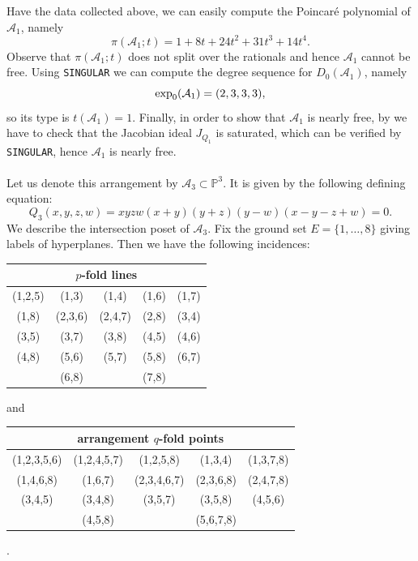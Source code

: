 \documentclass[11pt]{article}
\theoremstyle{plain}
\theoremstyle{definition}
\begin{document}
Have the data collected above, we can easily compute the Poincar\'e polynomial of $\mathcal{A}_{1}$, namely
$$\pi(\mathcal{A}_{1};t) = 1 + 8t + 24t^{2} + 31t^{3} + 14t^{4}.$$
Observe that $\pi(\mathcal{A}_{1};t)$ does not split over the rationals and hence $\mathcal{A}_{1}$ cannot be free. Using \texttt{SINGULAR} we can compute the degree sequence for $D_{0}(\mathcal{A}_{1})$, namely
$${\rm exp}_{0}(\mathcal{A}_{1}) = (2,3,3,3),$$
so its type is $t(\mathcal{A}_{1})=1$.
Finally, in order to show that $\mathcal{A}_{1}$ is nearly free, by \cite[Theorem 5.4]{DS} we have to check that the Jacobian ideal $J_{Q_{1}}$ is saturated, which can be verified by \texttt{SINGULAR}, hence $\mathcal{A}_{1}$ is nearly free.
\\\\
\noindent
{}
\vskip 5pt
\noindent
Let us denote this arrangement by $\mathcal{A}_{3} \subset \mathbb{P}^{3}$. It is given by the following defining equation:
$$Q_{3}(x,y,z,w) = xyzw(x+y)(y+z)(y-w)(x-y-z+w)=0.$$
We describe the intersection poset of $\mathcal{A}_{3}$. Fix the ground set $E= \{1, \ldots , 8\}$ giving labels of hyperplanes. Then we have the following incidences:
\begin{center}
\begin{tabular}{ c c c c c }
\multicolumn{5}{c}{$p$-fold lines} \\\hline \hline
 (1,2,5) & (1,3) & (1,4) & (1,6) & (1,7) \\
 (1,8) & (2,3,6) & (2,4,7) & (2,8) & (3,4) \\
 (3,5) & (3,7) & (3,8) & (4,5) & (4,6) \\
 (4,8) & (5,6) & (5,7) & (5,8) & (6,7) \\
       & (6,8) &       & (7,8) &

\end{tabular}
\end{center}
and 
\begin{center}
\begin{tabular}{ c c c c c }
\multicolumn{5}{c}{arrangement $q$-fold points} \\ \hline \hline 
 (1,2,3,5,6) &  (1,2,4,5,7) &  (1,2,5,8) &  (1,3,4) &  (1,3,7,8) \\
 (1,4,6,8) & (1,6,7) & (2,3,4,6,7) & (2,3,6,8) & (2,4,7,8) \\
 (3,4,5) & (3,4,8) & (3,5,7) & (3,5,8) & (4,5,6) \\
 & (4,5,8) & & (5,6,7,8) &

\end{tabular}.
\end{center}
\end{document}
